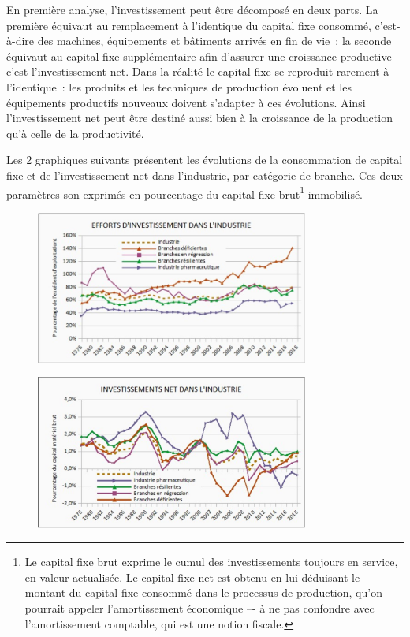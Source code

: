 \documentclass[a4paper]{article}
\begin{document}
En première analyse, l’investissement peut être décomposé en deux parts. La première équivaut au remplacement à l’identique du capital fixe consommé, c’est-à-dire des machines, équipements et bâtiments arrivés en fin de vie~; la seconde équivaut au capital fixe supplémentaire afin d’assurer une croissance productive – c’est l’investissement net. Dans la réalité le capital fixe se reproduit rarement à l’identique~: les produits et les techniques de production évoluent et les équipements productifs nouveaux doivent s’adapter à ces évolutions. Ainsi l’investissement  net  peut être destiné aussi bien à la croissance de la production qu’à celle de la productivité.

Les 2 graphiques suivants présentent les évolutions de la consommation de capital fixe et de l’investissement net dans l’industrie, par catégorie de branche. Ces deux paramètres son exprimés en pourcentage du capital fixe brut\footnote{Le capital  fixe brut exprime le cumul des investissements toujours en service, en valeur actualisée. Le capital fixe net est obtenu en lui déduisant le montant du capital fixe consommé dans le processus de production, qu’on pourrait appeler l’amortissement économique –- à ne pas confondre avec l’amortissement comptable, qui est une notion fiscale.} immobilisé. 

\begin{figure}[H]
    \centering
    \includegraphics*[width=0.8\textwidth]{images/investissement}
    \label{fig:investissement}
\end{figure}

\begin{figure}[H]
    \centering
    \includegraphics*[width=0.8\textwidth]{images/investissement-net}
    \label{fig:couverture}
\end{figure}
\end{document}
